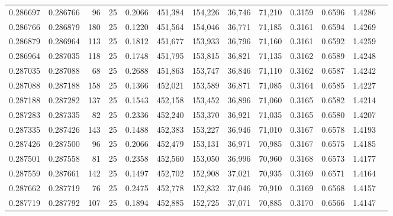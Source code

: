 \begin{tabular}{rrrrrrrrrrrrr}
0.286697 & 0.286766 &    96 &  25 &                                     0.2066 & 451,384 & 154,226 &  36,746 &  71,210 & 0.3159 & 0.6596 & 1.4286 \\
0.286766 & 0.286879 &   180 &  25 &                                     0.1220 & 451,564 & 154,046 &  36,771 &  71,185 & 0.3161 & 0.6594 & 1.4269 \\
0.286879 & 0.286964 &   113 &  25 &                                     0.1812 & 451,677 & 153,933 &  36,796 &  71,160 & 0.3161 & 0.6592 & 1.4259 \\
0.286964 & 0.287035 &   118 &  25 &                                     0.1748 & 451,795 & 153,815 &  36,821 &  71,135 & 0.3162 & 0.6589 & 1.4248 \\
0.287035 & 0.287088 &    68 &  25 &                                     0.2688 & 451,863 & 153,747 &  36,846 &  71,110 & 0.3162 & 0.6587 & 1.4242 \\
0.287088 & 0.287188 &   158 &  25 &                                     0.1366 & 452,021 & 153,589 &  36,871 &  71,085 & 0.3164 & 0.6585 & 1.4227 \\
0.287188 & 0.287282 &   137 &  25 &                                     0.1543 & 452,158 & 153,452 &  36,896 &  71,060 & 0.3165 & 0.6582 & 1.4214 \\
0.287283 & 0.287335 &    82 &  25 &                                     0.2336 & 452,240 & 153,370 &  36,921 &  71,035 & 0.3165 & 0.6580 & 1.4207 \\
0.287335 & 0.287426 &   143 &  25 &                                     0.1488 & 452,383 & 153,227 &  36,946 &  71,010 & 0.3167 & 0.6578 & 1.4193 \\
0.287426 & 0.287500 &    96 &  25 &                                     0.2066 & 452,479 & 153,131 &  36,971 &  70,985 & 0.3167 & 0.6575 & 1.4185 \\
0.287501 & 0.287558 &    81 &  25 &                                     0.2358 & 452,560 & 153,050 &  36,996 &  70,960 & 0.3168 & 0.6573 & 1.4177 \\
0.287559 & 0.287661 &   142 &  25 &                                     0.1497 & 452,702 & 152,908 &  37,021 &  70,935 & 0.3169 & 0.6571 & 1.4164 \\
0.287662 & 0.287719 &    76 &  25 &                                     0.2475 & 452,778 & 152,832 &  37,046 &  70,910 & 0.3169 & 0.6568 & 1.4157 \\
0.287719 & 0.287792 &   107 &  25 &                                     0.1894 & 452,885 & 152,725 &  37,071 &  70,885 & 0.3170 & 0.6566 & 1.4147 \\

\end{tabular}
